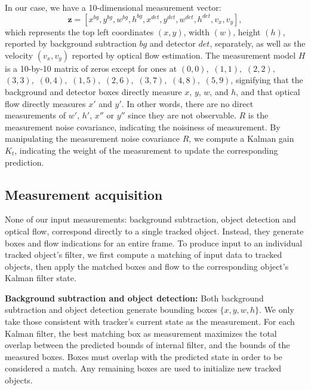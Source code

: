 In our case, we have a 10-dimensional measurement vector: 
$$\mathbf{z}=[x^{bg}, y^{bg}, w^{bg}, h^{bg}, x^{det}, y^{det}, w^{det}, h^{det}, v_x, v_y],$$ 
which represents the top left coordinates $(x, y)$, width $(w)$, height $(h)$, reported by background subtraction $bg$ and detector $det$, separately, as well as the velocity $(v_x, v_y)$ reported by optical flow estimation. 
The measurement model $H$ is a 10-by-10 matrix of zeros except for ones at $(0, 0),$ $(1, 1),$ $(2, 2),$ $(3, 3),$ $(0, 4),$ $(1, 5),$ $(2, 6),$ $(3, 7),$ $(4, 8),$ $(5,9)$, signifying that the background and detector boxes directly measure $x$, $y$, $w$, and $h$, and that optical flow directly measures $x'$ and $y'$. In other words, there are no direct measurements of $w'$, $h'$, $x''$ or $y''$ since they are not observable.
$R$ is the measurement noise covariance, indicating the noisiness of measurement. By manipulating the measurement noise covariance $R$, we compute a Kalman gain $K_t$, indicating the weight of the measurement to update the corresponding prediction. 


\subsection{Measurement acquisition}

None of our input measurements: background subtraction, object detection and optical flow, correspond directly to a single tracked object. Instead, they generate boxes and flow indications for an entire frame.
To produce input to an individual tracked object's filter, we first compute a matching of input data to tracked objects, then apply the matched boxes and flow to the corresponding object's Kalman filter state. 

\textbf{Background subtraction and object detection:}
Both background subtraction and object detection generate bounding boxes $\{x,y,w,h\}$. We only take those consistent with tracker's current state as the measurement. For each Kalman filter, the best matching box as measurement maximizes the total overlap between the predicted bounds of internal filter, and the bounds of the measured boxes. Boxes must overlap with the predicted state in order to be considered a match. Any remaining boxes are used to initialize new tracked objects. 

